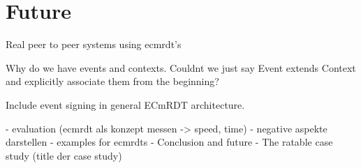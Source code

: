 \documentclass[
	ngerman,
	ruledheaders=section,   %
	class=report,		    %
	thesis={type=bachelor}, %
	accentcolor=9c,			%
	custommargins=true,    %
	marginpar=false,        %
	parskip=half-,          %
	fontsize=11pt,          %
]{tudapub}
\begin{document}
\chapter{Future}
Real peer to peer systems using ecmrdt's 

Why do we have events and contexts. Couldnt we just say Event extends Context and explicitly associate them from the beginning?

Include event signing in general ECmRDT architecture.

- evaluation (ecmrdt als konzept messen -> speed, time)
- negative aspekte darstellen
- examples for ecmrdts
- Conclusion and future
- The ratable case study (title der case study)
\end{document}
